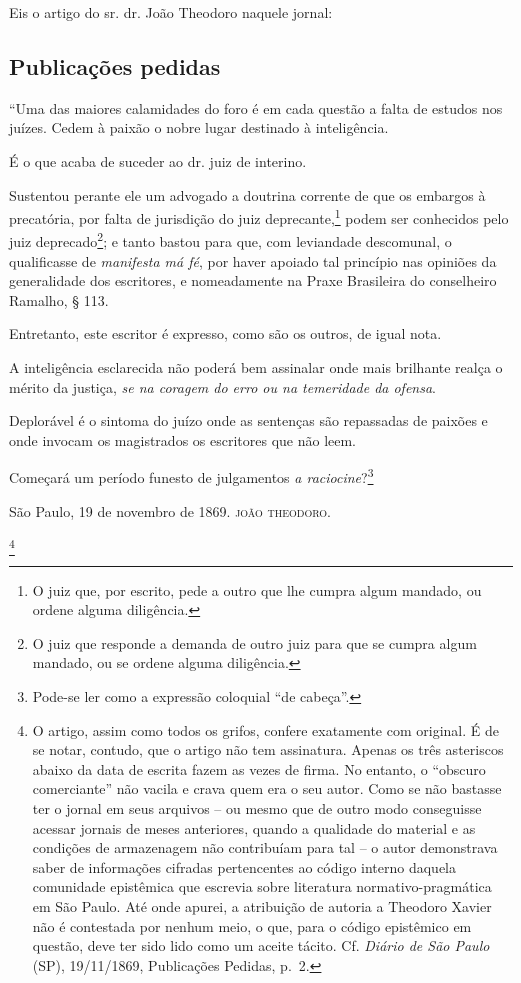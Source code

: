 Eis o artigo do sr. dr. João Theodoro naquele jornal:

\subsection{Publicações pedidas}

``Uma das maiores calamidades do foro é em cada questão a falta de
estudos nos juízes. Cedem à paixão o nobre lugar destinado à
inteligência.

É o que acaba de suceder ao dr. juiz de interino.

Sustentou perante ele um advogado a doutrina corrente de que os embargos
à precatória, por falta de jurisdição do juiz deprecante,\footnote{ O
  juiz que, por escrito, pede a outro que lhe cumpra algum mandado, ou
  ordene alguma diligência.} podem ser conhecidos pelo juiz
deprecado\footnote{ O juiz que responde a demanda de outro juiz para
  que se cumpra algum mandado, ou se ordene alguma diligência.}; e tanto
bastou para que, com leviandade descomunal, o qualificasse de
\emph{manifesta má fé}, por haver apoiado tal princípio nas opiniões da
generalidade dos escritores, e nomeadamente na Praxe Brasileira do
conselheiro Ramalho, § 113.

Entretanto, este escritor é expresso, como são os outros, de igual nota.

A inteligência esclarecida não poderá bem assinalar onde mais brilhante
realça o mérito da justiça, \emph{se na coragem do erro ou na temeridade
da ofensa}.

Deplorável é o sintoma do juízo onde as sentenças são repassadas de
paixões e onde invocam os magistrados os escritores que não leem.

Começará um período funesto de julgamentos \emph{a
raciocine}?\footnote{ Pode-se ler como a expressão coloquial ``de
  cabeça''.}
\begin{flushright}
São Paulo, 19 de novembro de 1869.
\textsc{joão theodoro}.
\end{flushright}
\asterisc{}\footnote{ O artigo, assim como todos os grifos, confere exatamente
  com original. É de se notar, contudo, que o artigo não tem assinatura.
  Apenas os três asteriscos abaixo da data de escrita fazem as vezes de
  firma. No entanto, o ``obscuro comerciante'' não vacila e crava quem era
  o seu autor. Como se não bastasse ter o jornal em seus arquivos -- ou
  mesmo que de outro modo conseguisse acessar jornais de meses
  anteriores, quando a qualidade do material e as condições de
  armazenagem não contribuíam para tal -- o autor demonstrava saber de
  informações cifradas pertencentes ao código interno daquela comunidade
  epistêmica que escrevia sobre literatura normativo-pragmática em São
  Paulo. Até onde apurei, a atribuição de autoria a Theodoro Xavier não
  é contestada por nenhum meio, o que, para o código epistêmico em
  questão, deve ter sido lido como um aceite tácito. Cf. \emph{Diário de
  São Paulo} (SP), 19/11/1869, Publicações Pedidas, p.~2.}

